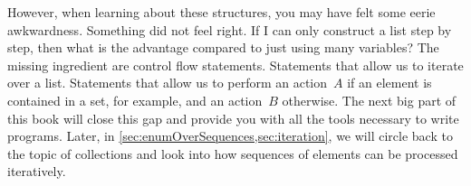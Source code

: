 However, when learning about these structures, you may have felt some eerie awkwardness.
Something did not feel right.
If I can only construct a list step by step, then what is the advantage compared to just using many variables?
The missing ingredient are control flow statements.
Statements that allow us to iterate over a list.
Statements that allow us to perform an action~$A$ if an element is contained in a set, for example, and an action~$B$ otherwise.
The next big part of this book will close this gap and provide you with all the tools necessary to write  programs.
Later, in \cref{sec:enumOverSequences,sec:iteration}, we will circle back to the topic of collections and look into how sequences of elements can be processed iteratively.%
%
\endhsection%
%

